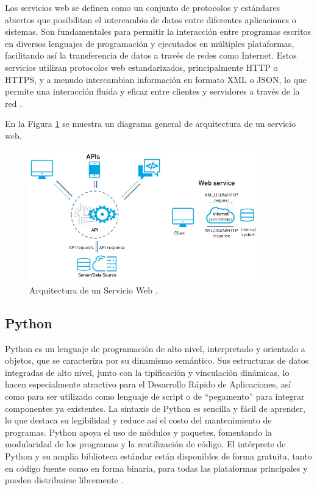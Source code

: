 Los servicios web se definen como un conjunto de protocolos y estándares abiertos
que posibilitan el intercambio de datos entre diferentes aplicaciones o sistemas.
Son fundamentales para permitir la interacción entre programas escritos en
diversos lenguajes de programación y ejecutados en múltiples plataformas, facilitando
así la transferencia de datos a través de redes como Internet. Estos servicios
utilizan protocolos web estandarizados, principalmente HTTP o HTTPS, y a menudo
intercambian información en formato XML o JSON, lo que permite una interacción fluida y
eficaz entre clientes y servidores a través de la red \cite{GeeksforGeeks_Web_Services}.

En la Figura \ref{fig:web-service} se muestra un diagrama general de arquitectura
de un servicio web.

\begin{figure}[!htbp]
  \centering
  \includegraphics[width=0.9\textwidth]{imagenes/02-marco-teorico/arquitectura-servicio-web.png}
  \caption[Arquitectura de un Servicio Web]{Arquitectura de un Servicio Web \cite{beltran2023servicioweb}.}
  \label{fig:web-service}
\end{figure}

\subsection{Python}
Python es un lenguaje de programación de alto nivel, interpretado y orientado a
objetos, que se caracteriza por su dinamismo semántico. Sus estructuras de datos
integradas de alto nivel, junto con la tipificación y vinculación dinámicas, lo
hacen especialmente atractivo para el Desarrollo Rápido de Aplicaciones, así
como para ser utilizado como lenguaje de script o de ``pegamento'' para integrar
componentes ya existentes. La sintaxis de Python es sencilla y fácil de aprender,
lo que destaca su legibilidad y reduce así el costo del mantenimiento de programas.
Python apoya el uso de módulos y paquetes, fomentando la modularidad de los
programas y la reutilización de código. El intérprete de Python y su amplia
biblioteca estándar están disponibles de forma gratuita, tanto en código fuente
como en forma binaria, para todas las plataformas principales y pueden distribuirse
libremente \cite{Python_org}.

